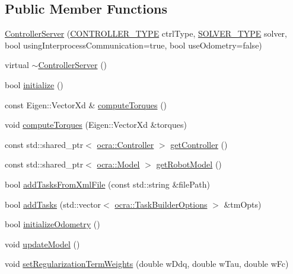 \subsection*{Public Member Functions}
\begin{DoxyCompactItemize}
\item 
\hyperlink{classocra__recipes_1_1ControllerServer_a78cc49b2b2a3f9daecc0662051b5644d}{Controller\+Server} (\hyperlink{namespaceocra__recipes_ae561cff4ea9a191b8b1ebb4e69a1a4ba}{C\+O\+N\+T\+R\+O\+L\+L\+E\+R\+\_\+\+T\+Y\+PE} ctrl\+Type, \hyperlink{namespaceocra__recipes_afb3bb4de56c2b9472c80d746eb13fed3}{S\+O\+L\+V\+E\+R\+\_\+\+T\+Y\+PE} solver, bool using\+Interprocess\+Communication=true, bool use\+Odometry=false)
\item 
virtual \hyperlink{classocra__recipes_1_1ControllerServer_a02157f0e6432dae6d8ebf3126c335444}{$\sim$\+Controller\+Server} ()
\item 
bool \hyperlink{classocra__recipes_1_1ControllerServer_af51ea42acb8c1adc3db4cc2a256f1f46}{initialize} ()
\item 
const Eigen\+::\+Vector\+Xd \& \hyperlink{classocra__recipes_1_1ControllerServer_a4b4c825748bc85f200f4b82cbffb8e0d}{compute\+Torques} ()
\item 
void \hyperlink{classocra__recipes_1_1ControllerServer_a925d4de1de73f0ac18e50f0f3c4cd0a4}{compute\+Torques} (Eigen\+::\+Vector\+Xd \&torques)
\item 
const std\+::shared\+\_\+ptr$<$ \hyperlink{classocra_1_1Controller}{ocra\+::\+Controller} $>$ \hyperlink{classocra__recipes_1_1ControllerServer_a40bc86b6d9a4140441320c88bfc77652}{get\+Controller} ()
\item 
const std\+::shared\+\_\+ptr$<$ \hyperlink{classocra_1_1Model}{ocra\+::\+Model} $>$ \hyperlink{classocra__recipes_1_1ControllerServer_ab83e5cc59e33d26cedbea43afae25e1e}{get\+Robot\+Model} ()
\item 
bool \hyperlink{classocra__recipes_1_1ControllerServer_ad2ca7fafa8c7fff009581df869f65d85}{add\+Tasks\+From\+Xml\+File} (const std\+::string \&file\+Path)
\item 
bool \hyperlink{classocra__recipes_1_1ControllerServer_ad78efdf5d90308b0dc8e88d6d0720c5f}{add\+Tasks} (std\+::vector$<$ \hyperlink{classocra_1_1TaskBuilderOptions}{ocra\+::\+Task\+Builder\+Options} $>$ \&tm\+Opts)
\item 
bool \hyperlink{classocra__recipes_1_1ControllerServer_a441016519ed42fee35c1fd9ae458d874}{initialize\+Odometry} ()
\item 
void \hyperlink{classocra__recipes_1_1ControllerServer_a83755d02be88fa3805d770d964995fb0}{update\+Model} ()
\item 
void \hyperlink{classocra__recipes_1_1ControllerServer_a973ce4838c4eff0a88e3286c722698c6}{set\+Regularization\+Term\+Weights} (double w\+Ddq, double w\+Tau, double w\+Fc)
\end{DoxyCompactItemize}
